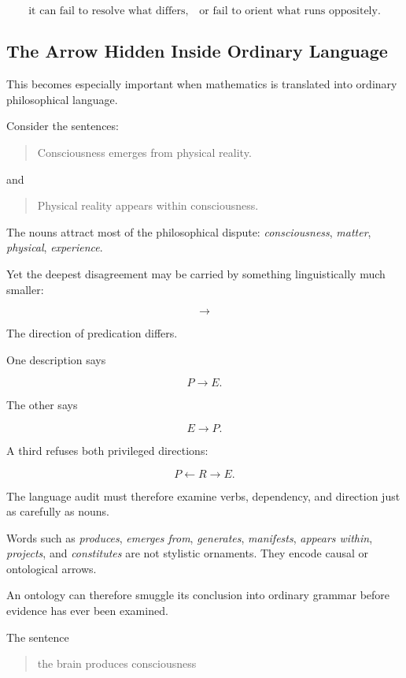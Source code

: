 \[
\boxed{
\text{it can fail to resolve what differs,}
\quad\text{or fail to orient what runs oppositely.}
}
\]

\subsection{The Arrow Hidden Inside Ordinary Language}

This becomes especially important when mathematics is translated into ordinary philosophical language.

Consider the sentences:

\begin{quote}
Consciousness emerges from physical reality.
\end{quote}

and

\begin{quote}
Physical reality appears within consciousness.
\end{quote}

The nouns attract most of the philosophical dispute: \emph{consciousness}, \emph{matter}, \emph{physical}, \emph{experience}.

Yet the deepest disagreement may be carried by something linguistically much smaller:

\[
\boxed{\longrightarrow}
\]

The direction of predication differs.

One description says

\[
P\rightarrow E.
\]

The other says

\[
E\rightarrow P.
\]

A third refuses both privileged directions:

\[
P\leftarrow R\rightarrow E.
\]

The language audit must therefore examine verbs, dependency, and direction just as carefully as nouns.

Words such as \emph{produces}, \emph{emerges from}, \emph{generates}, \emph{manifests}, \emph{appears within}, \emph{projects}, and \emph{constitutes} are not stylistic ornaments. They encode causal or ontological arrows.

An ontology can therefore smuggle its conclusion into ordinary grammar before evidence has ever been examined.

The sentence

\begin{quote}
the brain produces consciousness
\end{quote}

